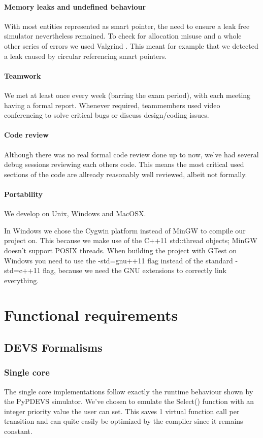\documentclass[8pt,a4paper]{report}
\begin{document}
\subsubsection{Memory leaks and undefined behaviour}
With most entities represented as smart pointer, the need to ensure a leak free simulator nevertheless remained. To check for allocation misuse and a whole other series of errors we used Valgrind \cite{vg}. This meant for example that we detected a leak caused by circular referencing smart pointers.

\subsubsection{Teamwork}
We met at least once every week (barring the exam period), with each meeting having a formal report. Whenever required, teammembers used video conferencing to solve critical bugs or discuss design/coding issues.
\subsubsection{Code review}
Although there was no real formal code review done up to now, we've had several debug sessions reviewing each others code. This means the most critical used sections of the code are allready reasonably well reviewed, albeit not formally.
\subsubsection{Portability}
We develop on Unix, Windows and MacOSX.

In Windows we chose the Cygwin platform instead of MinGW to compile our project on. This because we make use of the C++11 std::thread objects; MinGW doesn't support POSIX threads. When building the project with GTest on Windows you need to use the -std=gnu++11 flag instead of the standard -std=c++11 flag, because we need the GNU extensions to correctly link everything.

\chapter{Functional requirements}
\section{DEVS Formalisms}
\subsection{Single core}
The single core implementations follow exactly the runtime behaviour shown by the PyPDEVS simulator. We've chosen to emulate the Select() function with an integer priority value the user can set. This saves 1 virtual function call per transition and can quite easily be optimized by the compiler since it remains constant.
\end{document}
